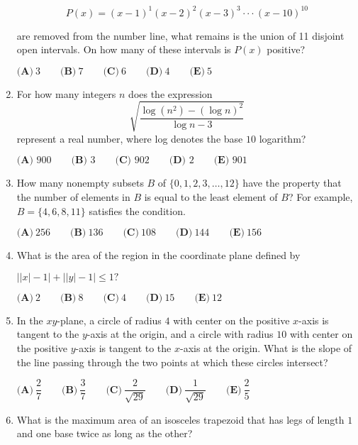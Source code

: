 \documentclass{article}
\begin{document}
\begin{enumerate}[label=\arabic*., itemsep=0.5em]
\begin{equation*}
P(x)  = (x-1)^1 (x-2)^2 (x-3)^3 \cdot \cdot \cdot (x-10)^{10}
\end{equation*}


are removed from the number line, what remains is the union of 11 disjoint open intervals. On how many of these intervals is \(P(x)\) positive?

\(\textbf{(A)}~3\qquad\textbf{(B)}~7\qquad\textbf{(C)}~6\qquad\textbf{(D)}~4\qquad\textbf{(E)}~5\)\par \vspace{0.5em}\item For how many integers \(n\) does the expression
\begin{equation*}
\sqrt{\frac{\log (n^2) - (\log n)^2}{\log n - 3}}
\end{equation*}
represent a real number, where log denotes the base \(10\) logarithm?

\(\textbf{(A) }900 \qquad \textbf{(B) }3\qquad \textbf{(C) }902 \qquad \textbf{(D) } 2  \qquad \textbf{(E) }901\)\par \vspace{0.5em}\item How many nonempty subsets \(B\) of \(\{0, 1, 2, 3, \dots, 12\}\) have the property that the number of elements in \(B\) is equal to the least element of \(B\)? For example, \(B = \{4, 6, 8, 11\}\) satisfies the condition.

\(\textbf{(A)}\ 256 \qquad\textbf{(B)}\ 136 \qquad\textbf{(C)}\ 108 \qquad\textbf{(D)}\ 144 \qquad\textbf{(E)}\ 156\)\par \vspace{0.5em}\item What is the area of the region in the coordinate plane defined by

\(\left||x|-1\right|+\left||y|-1\right|\leq 1?\)

\(\textbf{(A)}~2\qquad\textbf{(B)}~8\qquad\textbf{(C)}~4\qquad\textbf{(D)}~15\qquad\textbf{(E)}~12\)\par \vspace{0.5em}\item In the \(xy\)-plane, a circle of radius \(4\) with center on the positive \(x\)-axis is tangent to the \(y\)-axis at the origin, and a circle with radius \(10\) with center on the positive \(y\)-axis is tangent to the \(x\)-axis at the origin. What is the slope of the line passing through the two points at which these circles intersect?

\(\textbf{(A)}\ \dfrac{2}{7} \qquad\textbf{(B)}\ \dfrac{3}{7}  \qquad\textbf{(C)}\ \dfrac{2}{\sqrt{29}}  \qquad\textbf{(D)}\ \dfrac{1}{\sqrt{29}}  \qquad\textbf{(E)}\ \dfrac{2}{5}\)\par \vspace{0.5em}\item What is the maximum area of an isosceles trapezoid that has legs of length \(1\) and one base twice as long as the other?


\end{enumerate}
\end{document}
